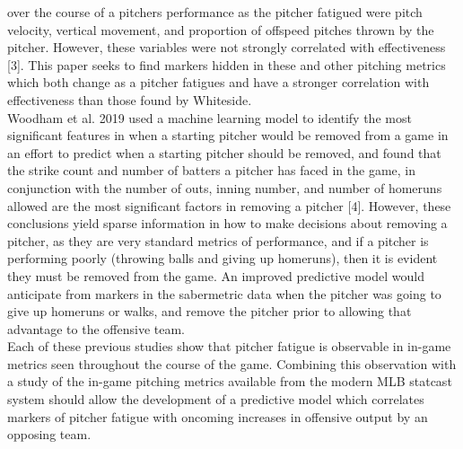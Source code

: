 \documentclass[12 pt]{article}
\begin{document}
over the course of a pitchers performance as the pitcher fatigued were pitch 
velocity, vertical movement, and proportion of offspeed pitches thrown by the pitcher. However, 
these variables were not strongly correlated with effectiveness [3]. This paper seeks to find markers 
hidden in these and other pitching metrics which both change as a pitcher fatigues and 
have a stronger correlation with effectiveness than those found by Whiteside.
\\ \indent Woodham et al. 2019 used a machine learning model to identify the most 
significant features in when a starting pitcher would be removed from a game in an effort 
to predict when a starting pitcher should be removed, and found that the strike count 
and number of batters a pitcher has faced in the game, in conjunction with the number of outs, 
inning number, and number of homeruns allowed are the most significant factors in removing a pitcher [4]. 
However, these conclusions yield sparse information in how to make decisions about removing a pitcher, 
as they are very standard metrics of performance, and if a pitcher is performing poorly 
(throwing balls and giving up homeruns), then it is evident they must be removed 
from the game. An improved predictive model would anticipate from markers in the sabermetric 
data when the pitcher was going to give up homeruns or walks, and remove the pitcher prior to allowing 
that advantage to the offensive team.
\\ \indent Each of these previous studies show that pitcher fatigue is observable in 
in-game metrics seen throughout the course of the game. Combining this observation with a 
study of the in-game pitching metrics available from the modern MLB statcast system should 
allow the development of a predictive model which correlates markers of pitcher fatigue with 
oncoming increases in offensive output by an opposing team. \\
\end{document}
